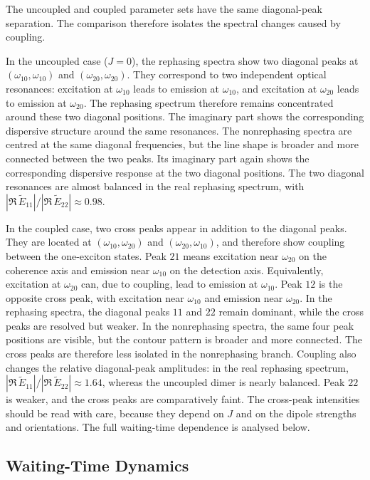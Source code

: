 The uncoupled and coupled parameter sets have the same diagonal-peak separation. The comparison therefore isolates the spectral changes caused by coupling.

In the uncoupled case ($J=0$), the rephasing spectra show two diagonal peaks at $(\omega_{10},\omega_{10})$ and $(\omega_{20},\omega_{20})$. They correspond to two independent optical resonances: excitation at $\omega_{10}$ leads to emission at $\omega_{10}$, and excitation at $\omega_{20}$ leads to emission at $\omega_{20}$. The rephasing spectrum therefore remains concentrated around these two diagonal positions. The imaginary part shows the corresponding dispersive structure around the same resonances. The nonrephasing spectra are centred at the same diagonal frequencies, but the line shape is broader and more connected between the two peaks. Its imaginary part again shows the corresponding dispersive response at the two diagonal positions. The two diagonal resonances are almost balanced in the real rephasing spectrum, with \(|\Re\,\tilde{E}_{11}|/|\Re\,\tilde{E}_{22}|\approx 0.98\).

In the coupled case, two cross peaks appear in addition to the diagonal peaks. They are located at $(\omega_{10},\omega_{20})$ and $(\omega_{20},\omega_{10})$, and therefore show coupling between the one-exciton states. Peak $21$ means excitation near $\omega_{20}$ on the coherence axis and emission near $\omega_{10}$ on the detection axis. Equivalently, excitation at $\omega_{20}$ can, due to coupling, lead to emission at $\omega_{10}$. Peak $12$ is the opposite cross peak, with excitation near $\omega_{10}$ and emission near $\omega_{20}$. In the rephasing spectra, the diagonal peaks $11$ and $22$ remain dominant, while the cross peaks are resolved but weaker. In the nonrephasing spectra, the same four peak positions are visible, but the contour pattern is broader and more connected. The cross peaks are therefore less isolated in the nonrephasing branch. Coupling also changes the relative diagonal-peak amplitudes: in the real rephasing spectrum, \(|\Re\,\tilde{E}_{11}|/|\Re\,\tilde{E}_{22}|\approx 1.64\), whereas the uncoupled dimer is nearly balanced. Peak $22$ is weaker, and the cross peaks are comparatively faint. The cross-peak intensities should be read with care, because they depend on \(J\) and on the dipole strengths and orientations. The full waiting-time dependence is analysed below.

\subsection{Waiting-Time Dynamics}
\label{subsec:results_dimer_waiting_time}

